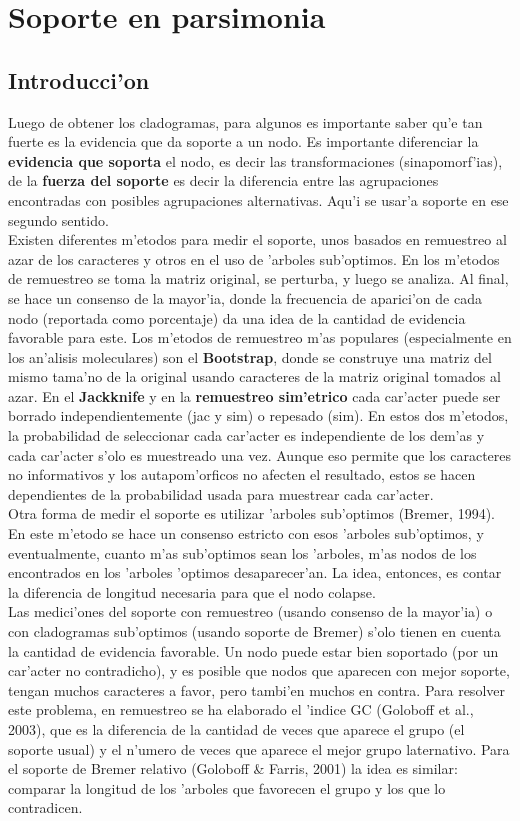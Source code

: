 \chapter{Soporte en parsimonia}
\section*{Introducci'on}
Luego de obtener los cladogramas, para algunos es importante saber qu'e tan fuerte es la evidencia que da soporte a un nodo. Es importante diferenciar la \textbf{evidencia que soporta} el nodo, es decir las transformaciones (sinapomorf'ias), de la \textbf{fuerza del soporte} es decir la diferencia entre las agrupaciones encontradas con posibles agrupaciones alternativas. Aqu'i se usar'a soporte en ese segundo sentido.\\
Existen diferentes m'etodos para medir el soporte, unos basados en remuestreo al azar de los caracteres y otros en el uso de 'arboles sub'optimos. En los m'etodos de remuestreo se toma la matriz original, se perturba, y luego se analiza. Al final, se hace un consenso de la mayor'ia, donde la frecuencia de aparici'on de cada nodo (reportada como porcentaje) da una idea de la cantidad de evidencia favorable para este. Los m'etodos de remuestreo m'as populares (especialmente en los an'alisis moleculares) son el \textbf{Bootstrap}, donde se construye una matriz del mismo tama'no de la original usando caracteres de la matriz original tomados al azar. En el \textbf{Jackknife} y en la \textbf{remuestreo sim'etrico} cada car'acter puede ser borrado independientemente (jac y sim) o repesado (sim). En estos dos m'etodos, la probabilidad de seleccionar cada car'acter es independiente de los dem'as y cada car'acter s'olo es muestreado una vez. Aunque eso permite que los caracteres no informativos y los autapom'orficos no afecten el resultado, estos se hacen dependientes de la probabilidad usada para muestrear cada car'acter.\\
Otra forma de medir el soporte es utilizar 'arboles sub'optimos (Bremer, 1994). En este m'etodo se hace un consenso estricto con esos 'arboles sub'optimos, y eventualmente, cuanto m'as sub'optimos sean los 'arboles, m'as nodos de los encontrados en los 'arboles 'optimos desaparecer'an. La idea, entonces, es contar la diferencia de longitud necesaria para que el nodo colapse.\\
Las medici'ones del soporte con remuestreo (usando consenso de la mayor'ia) o con cladogramas sub'optimos (usando soporte de Bremer) s'olo tienen en cuenta la cantidad de evidencia favorable. Un nodo puede estar bien soportado (por un car'acter no contradicho), y es posible que nodos que aparecen con mejor soporte, tengan muchos caracteres a favor, pero tambi'en muchos en contra. Para resolver este problema, en remuestreo se ha elaborado el 'indice GC (Goloboff et al., 2003), que es la diferencia de la cantidad de veces que aparece el grupo (el soporte usual) y el n'umero de veces que aparece el mejor grupo laternativo. Para el soporte de Bremer relativo (Goloboff \& Farris, 2001) la idea es similar: comparar la longitud de los 'arboles que favorecen el grupo y los que lo contradicen.\\
